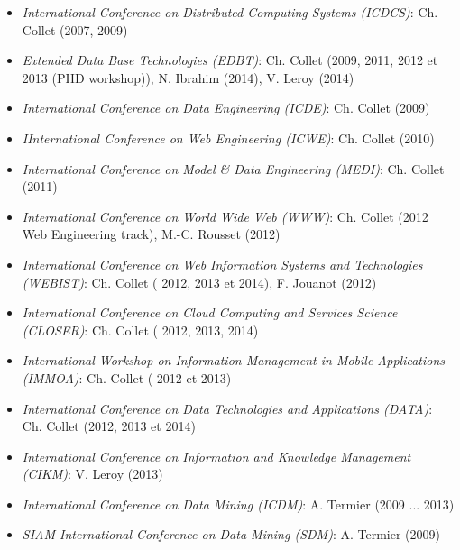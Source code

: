 \begin{itemize}

\setlength{\itemindent}{-0.5cm}
\setlength{\itemsep}{-0.1cm}

\item {\it International Conference on Distributed Computing Systems (ICDCS)}: Ch. Collet (2007, 2009)

\item {\it Extended Data Base Technologies (EDBT)}:  Ch. Collet (2009, 2011, 2012 et 2013 (PHD workshop)), N. Ibrahim (2014), V. Leroy (2014)

\item {\it International Conference on Data Engineering (ICDE)}:  Ch. Collet (2009)

\item {\it IInternational Conference on Web Engineering (ICWE)}:  Ch. Collet (2010)

\item {\it International Conference on Model \& Data Engineering (MEDI)}:  Ch. Collet (2011)

\item {\it International Conference on World Wide Web (WWW)}:  Ch. Collet (2012 Web Engineering track), M.-C. Rousset (2012)

\item {\it International Conference on Web Information Systems and Technologies (WEBIST)}:  Ch. Collet ( 2012, 2013 et 2014), F. Jouanot (2012)

\item {\it International Conference on Cloud Computing and Services Science (CLOSER)}:  Ch. Collet ( 2012, 2013, 2014)

\item {\it  International Workshop on Information Management in Mobile Applications (IMMOA)}:  Ch. Collet ( 2012 et 2013)

\item {\it International Conference on Data Technologies and Applications (DATA)}:  Ch. Collet (2012, 2013 et 2014)

\item {\it International Conference on Information and Knowledge Management (CIKM)}: V. Leroy (2013)

\item {\it International Conference on Data Mining (ICDM)}: A. Termier (2009 ... 2013)

\item {\it SIAM International Conference on Data Mining (SDM)}: A. Termier (2009)


\end{itemize}
